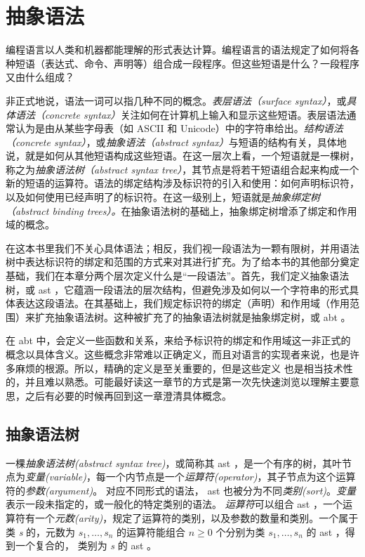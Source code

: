 \chapter{抽象语法}

编程语言以人类和机器都能理解的形式表达计算。编程语言的语法规定了如何将各种短语（表达式、命令、声明等）组合成一段程序。但这些短语是什么？一段程序又由什么组成？

非正式地说，语法一词可以指几种不同的概念。\emph{表层语法（surface
syntax）}，或\emph{具体语法（concrete
syntax）}关注如何在计算机上输入和显示这些短语。表层语法通常认为是由从某些字母表（如
ASCII 和 Unicode）中的字符串给出。\emph{结构语法（concrete
syntax）}，或\emph{抽象语法（abstract
syntax）}与短语的结构有关，具体地说，就是如何从其他短语构成这些短语。在这一层次上看，一个短语就是一棵树，称之为\emph{抽象语法树（abstract
syntax
tree）}，其节点是将若干短语组合起来构成一个新的短语的运算符。语法的绑定结构涉及标识符的引入和使用：如何声明标识符，以及如何使用已经声明了的标识符。在这一级别上，短语就是\emph{抽象绑定树（abstract
binding
trees）。}在抽象语法树的基础上，抽象绑定树增添了绑定和作用域的概念。

在这本书里我们不关心具体语法；相反，我们视一段语法为一颗有限树，并用语法树中表达标识符的绑定和范围的方式来对其进行扩充。为了给本书的其他部分奠定基础，我们在本章分两个层次定义什么是``一段语法''。首先，我们定义抽象语法树，或
ast
，它蕴涵一段语法的层次结构，但避免涉及如何以一个字符串的形式具体表达这段语法。在其基础上，我们规定标识符的绑定（声明）和作用域（作用范围）来扩充抽象语法树。这种被扩充了的抽象语法树就是抽象绑定树，或
abt 。

在 abt
中，会定义一些函数和关系，来给予标识符的绑定和作用域这一非正式的概念以具体含义。这些概念非常难以正确定义，而且对语言的实现者来说，也是许多麻烦的根源。所以，精确的定义是至关重要的，但是这些定义
也是相当技术性的，并且难以熟悉。可能最好读这一章节的方式是第一次先快速浏览以理解主要意思，之后有必要的时候再回到这一章澄清具体概念。

\section{抽象语法树}

一棵\emph{抽象语法树(abstract syntax tree)}，或简称其 ast
，是一个有序的树，其叶节点为\emph{变量(variable)}，每一个内节点是一个\emph{运算符(operator)}，其子节点为这个运算符的\emph{参数(argument)}。
对应不同形式的语法， ast
也被分为不同\emph{类别(sort)}。\emph{变量}表示一段未指定的，或一般化的特定类别的语法。
\emph{运算符}可以组合 ast
，一个运算符有一个\emph{元数(arity)}，规定了运算符的类别，以及参数的数量和类别。一个属于类
\emph{s} 的，元数为 \(s_1,\dots,s_n\) 的运算符能组合 \( n \ge 0\)
个分别为类 \emph{\(s_1,\dots,s_n\)} 的 ast ，得到一个复合的， 类别为
\emph{s} 的 ast 。

